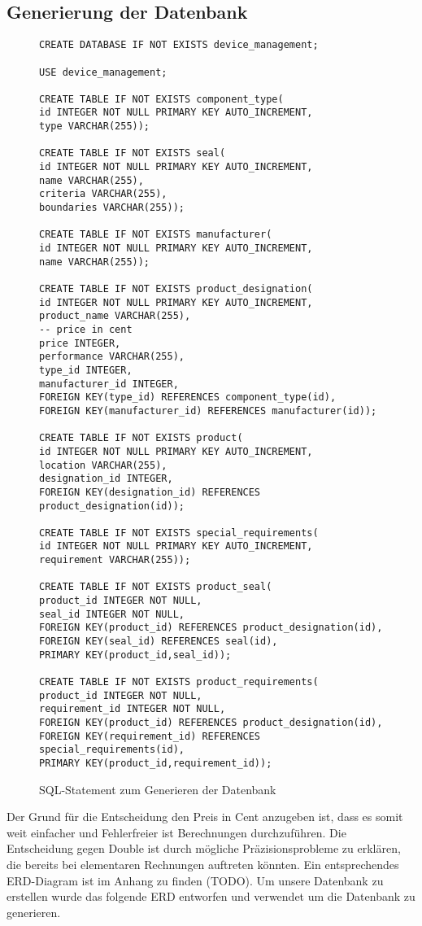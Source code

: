\documentclass{article}
\begin{document}
\subsection{Generierung der Datenbank}
\begin{figure}[!htbp]
\caption{SQL-Statement zum Generieren der Datenbank}
\begin{lstlisting}
CREATE DATABASE IF NOT EXISTS device_management;

USE device_management;

CREATE TABLE IF NOT EXISTS component_type(
id INTEGER NOT NULL PRIMARY KEY AUTO_INCREMENT, 
type VARCHAR(255));

CREATE TABLE IF NOT EXISTS seal(
id INTEGER NOT NULL PRIMARY KEY AUTO_INCREMENT, 
name VARCHAR(255),
criteria VARCHAR(255),
boundaries VARCHAR(255));

CREATE TABLE IF NOT EXISTS manufacturer(
id INTEGER NOT NULL PRIMARY KEY AUTO_INCREMENT, 
name VARCHAR(255));

CREATE TABLE IF NOT EXISTS product_designation(
id INTEGER NOT NULL PRIMARY KEY AUTO_INCREMENT, 
product_name VARCHAR(255),
-- price in cent
price INTEGER, 
performance VARCHAR(255),
type_id INTEGER,
manufacturer_id INTEGER,
FOREIGN KEY(type_id) REFERENCES component_type(id),
FOREIGN KEY(manufacturer_id) REFERENCES manufacturer(id));

CREATE TABLE IF NOT EXISTS product(
id INTEGER NOT NULL PRIMARY KEY AUTO_INCREMENT, 
location VARCHAR(255),
designation_id INTEGER,
FOREIGN KEY(designation_id) REFERENCES product_designation(id));

CREATE TABLE IF NOT EXISTS special_requirements(
id INTEGER NOT NULL PRIMARY KEY AUTO_INCREMENT, 
requirement VARCHAR(255));

CREATE TABLE IF NOT EXISTS product_seal(
product_id INTEGER NOT NULL, 
seal_id INTEGER NOT NULL,
FOREIGN KEY(product_id) REFERENCES product_designation(id),
FOREIGN KEY(seal_id) REFERENCES seal(id),
PRIMARY KEY(product_id,seal_id));

CREATE TABLE IF NOT EXISTS product_requirements(
product_id INTEGER NOT NULL, 
requirement_id INTEGER NOT NULL,
FOREIGN KEY(product_id) REFERENCES product_designation(id),
FOREIGN KEY(requirement_id) REFERENCES special_requirements(id),
PRIMARY KEY(product_id,requirement_id));
\end{lstlisting}
\end{figure}
Der Grund für die Entscheidung den Preis in Cent anzugeben ist, dass es somit weit einfacher und Fehlerfreier ist Berechnungen durchzuführen. Die Entscheidung gegen Double ist durch mögliche Präzisionsprobleme zu erklären, die bereits bei elementaren Rechnungen auftreten könnten. Ein entsprechendes ERD-Diagram ist im Anhang zu finden (TODO).
Um unsere Datenbank zu erstellen wurde das folgende ERD entworfen und verwendet um die Datenbank zu generieren.
\end{document}
